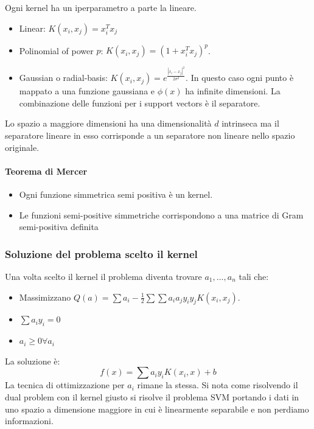 		Ogni kernel ha un iperparametro a parte la lineare.
		\begin{itemize}
			\item Linear: $K(x_i,x_j) = x_i^Tx_j$
			\item Polinomial of power $p$: $K(x_i, x_j) = (1+x_i^Tx_j)^p$.
			\item Gaussian o radial-basis: $K(x_i, x_j) = e^{\frac{|x_i - x_j|^2}{2\sigma^2}}$.
				In questo caso ogni punto \`e mappato a una funzione gaussiana e $\phi(x)$ ha infinite dimensioni.
				La combinazione delle funzioni per i support vectors \`e il separatore.
		\end{itemize}
		Lo spazio a maggiore dimensioni ha una dimensionalit\`a $d$ intrinseca ma il separatore lineare in esso corrisponde a un separatore non lineare nello spazio originale.

			\paragraph{Teorema di Mercer}
			\begin{itemize}
				\item Ogni funzione simmetrica semi positiva \`e un kernel.
				\item Le funzioni semi-positive simmetriche corrispondono a una matrice di Gram semi-positiva definita
			\end{itemize}

		\subsubsection{Soluzione del problema scelto il kernel}
		Una volta scelto il kernel il problema diventa trovare $a_1,\dots,a_n$ tali che:
		\begin{itemize}
			\item Massimizzano $Q(a) = \sum a_i-\frac{1}{2}\sum\sum a_ia_jy_iy_jK(x_i,x_j)$.
			\item $\sum a_iy_i = 0$
			\item $a_i\ge 0\forall a_i$
		\end{itemize}
		La soluzione \`e:
		$$f(x) = \sum a_iy_iK(x_i,x)+b$$
		La tecnica di ottimizzazione per $a_i$ rimane la stessa.
		Si nota come risolvendo il dual problem con il kernel giusto si risolve il problema SVM portando i dati in uno spazio a dimensione maggiore in cui \`e linearmente separabile e non perdiamo informazioni.
